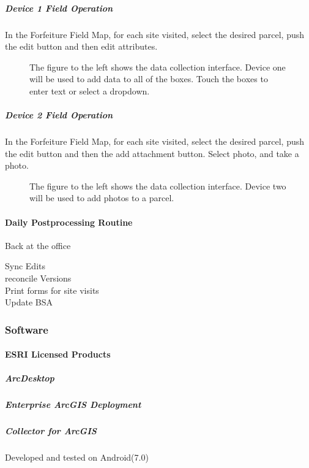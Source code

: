 \documentclass[class=article , crop=false, titlepage, twoside, multi={itemize, figure, verbatim}, float=false]{standalone}
\begin{document}
\subparagraph{Device 1 Field Operation}In the Forfeiture Field Map, for each site visited, select the desired parcel, push the edit button and then edit attributes.
\begin{figure}[h]
\begin{minipage}[t]{0.4\textwidth}
\centering {}
\label{img:device 1 data entry}
\end{minipage}
\begin{minipage}[t]{0.5\textwidth}
The figure to the left shows the data collection interface.  Device one will be used to add data to all of the boxes.  Touch the boxes to enter text or select a dropdown.
\end{minipage}
\end{figure}

\clearpage
\subparagraph{Device 2 Field Operation}In the Forfeiture Field Map, for each site visited, select the desired parcel, push the edit button and then the add attachment button.  Select photo, and take a photo.
\begin{figure}[h]
\begin{minipage}[t]{0.4\textwidth}
\centering {}
\label{img:device 1 data entry}
\end{minipage}
\begin{minipage}[t]{0.5\textwidth}
The figure to the left shows the data collection interface.  Device two will be used to add photos to a parcel.
\end{minipage}
\end{figure}
\paragraph{Daily Postprocessing Routine}Back at the office

\begin{description}
\item [Sync Edits] \blindtext
\item [reconcile Versions] \blindtext
\item[Print forms for site visits] \blindtext
\item[Update BSA] \blindtext
\end{description}

\clearpage
\subsubsection{Software}
\paragraph{ESRI Licensed Products}
\subparagraph{ArcDesktop}

\subparagraph{Enterprise ArcGIS Deployment}

\subparagraph{Collector for ArcGIS}Developed and tested on Android(7.0)
\end{document}
